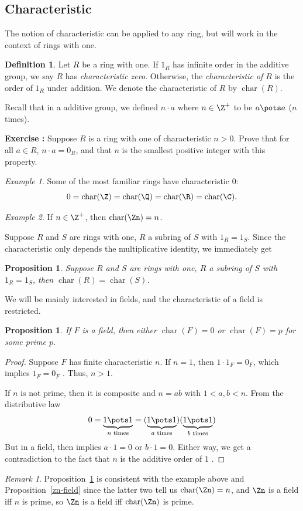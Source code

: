 \documentclass[12pt]{amsart}
\DeclareMathOperator{\chr}{char}
\newcounter{probs}
\newenvironment{prob}{%
  \refstepcounter{probs}
  \par\medskip\noindent\textbf{Exercise \theprobs:} }{\par\medskip}
\theoremstyle{plain}
\newtheorem{prop}[thm]{Proposition}
\theoremstyle{definition}
\newtheorem{defn}[thm]{Definition}
\theoremstyle{remark}
\newtheorem*{remark}{Remark}
\newtheorem*{exam}{Example}
\begin{document}
\subsection{Characteristic}
The notion of characteristic can be applied to any ring, but will work
in the context of rings with one.
\begin{defn}
  Let $R$ be a ring with one.  If $1_R$ has infinite order in the
  additive group, we say $R$ has \emph{characteristic zero}.  Otherwise, the
  \emph{characteristic of $R$} is the order of $1_R$ under addition.  We
  denote the characteristic of $R$ by $\chr(R)$.
\end{defn}
Recall that in a additive group, we defined $n\cdot a$ where
$n\in\Z^+$ to be $a\pots a$ ($n$ times).
\begin{prob}
  Suppose $R$ is a ring with one of characteristic $n>0$.  Prove that
  for all $a\in R$,
  $n\cdot a=0_R$, and that $n$ is the smallest positive integer with
  this property.
\end{prob}
\begin{exam}
  Some of the most familiar rings have characteristic $0$:
\[ 0= \chr(\Z)=\chr(\Q)=\chr(\R)=\chr(\C). \]
\end{exam}
\begin{exam}\label{zn-char}
  If $n\in\Z^+$, then $\chr(\Zn)=n$.
\end{exam}
Suppose $R$ and $S$ are rings with one, $R$ a subring of $S$ with
$1_R=1_S$.  Since the characteristic only depends the multiplicative
identity, we immediately get
\begin{prop}
Suppose $R$ and $S$ are rings with one, $R$ a subring of $S$ with
$1_R=1_S$, then $\chr(R)=\chr(S)$.
\end{prop}
We will be mainly interested in fields, and the characteristic of a
field is restricted.
\begin{prop} \label{field-char}
  If $F$ is a field, then either $\chr(F)=0$ or $\chr(F)=p$ for some
  prime $p$.
\end{prop}
\begin{proof}
  Suppose $F$ has finite characteristic $n$.  If $n=1$, then $1\cdot
  1_F=0_F$, which implies $1_F=0_F$ \con.  Thus, $n>1$.

  If $n$ is not prime, then it is composite and $n=ab$ with
  $1<a,b<n$.  From the distributive law
\[ 0=\underbrace{1\pots 1}_\text{$n$ times}  =  (\underbrace{1\pots
  1}_\text{$a$ times}) (\underbrace{1\pots 1}_\text{$b$ times})\]
But in a field, then implies $a\cdot 1=0$ or $b\cdot 1=0$.  Either
way, we get a contradiction to the fact that $n$ is the additive order
of $1$ \con.
\end{proof}
\begin{remark}
  Proposition~\ref{field-char} is consistent with the
  example above and Proposition~\ref{zn-field} since the
  latter two tell us $\chr(\Zn)=n$, and $\Zn$ is a field iff $n$ is
  prime, so $\Zn$ is a field iff $\chr(\Zn)$ is prime.
\end{remark}
\end{document}
